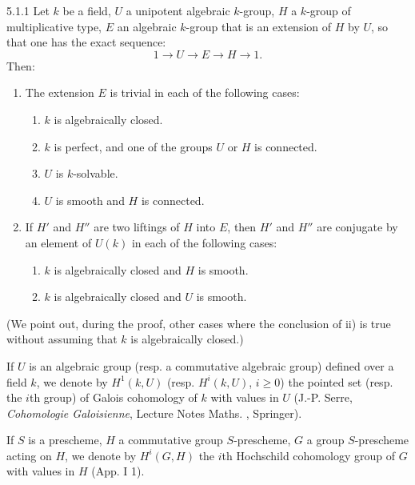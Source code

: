 \begin{theorem}{5.1.1}\label{XVII.5.1.1}
Let $k$ be a field, $U$ a unipotent algebraic $k$-group, $H$ a $k$-group of multiplicative type, $E$ an algebraic $k$-group that is an extension of $H$ by $U$, so that one has the exact sequence:
\[
 1\to U\to E\to H\to1.
\]
Then:
\begin{enumerate}[label=\textup{\roman*)}]
\item The extension $E$ is trivial in each of the following cases:
\begin{enumerate}[label=\textup{\alph*)}]
\item $k$ is algebraically closed.
\item $k$ is perfect, and one of the groups $U$ or $H$ is connected.
\item $U$ is $k$-solvable.
\item $U$ is smooth and $H$ is connected.
\end{enumerate}
\item If $H'$ and $H''$ are two liftings of $H$ into $E$, then $H'$ and $H''$ are conjugate by an element of $U(k)$ in each of the following cases:
\begin{enumerate}[label=\textup{\alph*)}]
\item $k$ is algebraically closed and $H$ is smooth.
\item $k$ is algebraically closed and $U$ is smooth.
\end{enumerate}
\end{enumerate}
\end{theorem}
(We point out, during the proof, other cases where the conclusion of ii) is true without assuming that $k$ is algebraically closed.)

If $U$ is an algebraic group (resp. a commutative algebraic group) defined over a field $k$, we denote by $H^1(k,U)$ (resp. $H^i(k,U)$, $i\geq0$) the pointed set (resp. the $i$th group) of Galois cohomology of $k$ with values in $U$ (\cf J.-P. Serre, \emph{Cohomologie Galoisienne}, Lecture Notes Maths. , Springer).

If $S$ is a prescheme, $H$ a commutative group $S$-prescheme, $G$ a group $S$-prescheme acting on $H$, we denote by $H^i(G,H)$ the $i$th Hochschild cohomology group of $G$ with values in $H$ (App. I 1).

